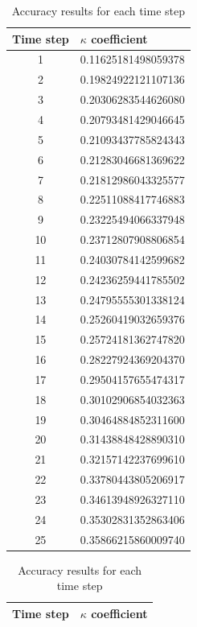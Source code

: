 \begin{table}[H]
\setlength{\tabcolsep}{12pt}
\renewcommand{\arraystretch}{1.1}
    \caption{Accuracy results for each time step}
    \label{table:kap2}
    \begin{minipage}{.5\linewidth}
            \begin{tabular}{@{}cl@{}}
            \toprule
            Time step & $\kappa$ coefficient \\ \midrule
            1 &  0.11625181498059378 \\
2 &  0.19824922121107136 \\
3 &  0.20306283544626080 \\
4 &  0.20793481429046645 \\
5 &  0.21093437785824343 \\
6 &  0.21283046681369622 \\
7 &  0.21812986043325577 \\
8 &  0.22511088417746883 \\
9 &  0.23225494066337948 \\
10 & 0.23712807908806854 \\
11 & 0.24030784142599682 \\
12 & 0.24236259441785502 \\
13 & 0.24795555301338124 \\
14 & 0.25260419032659376 \\
15 & 0.25724181362747820 \\
16 & 0.28227924369204370 \\
17 & 0.29504157655474317 \\
18 & 0.30102906854032363 \\
19 & 0.30464884852311600 \\
20 & 0.31438848428890310 \\
21 & 0.32157142237699610 \\
22 & 0.33780443805206917 \\
23 & 0.34613948926327110 \\
24 & 0.35302831352863406 \\
25 & 0.35866215860009740 \\ \bottomrule
        \end{tabular}
    \end{minipage}%
    \begin{minipage}{.5\linewidth}
        \begin{tabular}{@{}cl@{}}
          \toprule
          Time step & $\kappa$ coefficient \\ \midrule

\end{tabular}
\end{minipage}
\end{table}
